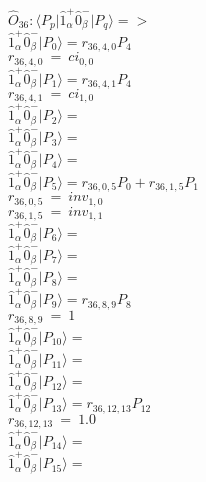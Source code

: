 \documentclass[14pt]{article}
\begin{document}
    $\hat{O}_{36}:  \langle{P_p}\vert \hat{1}_{\alpha}^{+}\hat{0}_{\beta}^{-} \vert{P_q}\rangle => $ \\ 
    $ \hat{1}_{\alpha}^{+}\hat{0}_{\beta}^{-} \vert{P_{0}}\rangle = {r}_{36,4,0}P_{4} $ \\ 
    ${r}_{36,4,0}\ =\ {ci}_{0,0} $ \\ 
    $ \hat{1}_{\alpha}^{+}\hat{0}_{\beta}^{-} \vert{P_{1}}\rangle = {r}_{36,4,1}P_{4} $ \\ 
    ${r}_{36,4,1}\ =\ {ci}_{1,0} $ \\ 
    $ \hat{1}_{\alpha}^{+}\hat{0}_{\beta}^{-} \vert{P_{2}}\rangle =  $ \\ 
    $ \hat{1}_{\alpha}^{+}\hat{0}_{\beta}^{-} \vert{P_{3}}\rangle =  $ \\ 
    $ \hat{1}_{\alpha}^{+}\hat{0}_{\beta}^{-} \vert{P_{4}}\rangle =  $ \\ 
    $ \hat{1}_{\alpha}^{+}\hat{0}_{\beta}^{-} \vert{P_{5}}\rangle = {r}_{36,0,5}P_{0}+{r}_{36,1,5}P_{1} $ \\ 
    ${r}_{36,0,5}\ =\ {inv}_{1,0} $ \\ 
    ${r}_{36,1,5}\ =\ {inv}_{1,1} $ \\ 
    $ \hat{1}_{\alpha}^{+}\hat{0}_{\beta}^{-} \vert{P_{6}}\rangle =  $ \\ 
    $ \hat{1}_{\alpha}^{+}\hat{0}_{\beta}^{-} \vert{P_{7}}\rangle =  $ \\ 
    $ \hat{1}_{\alpha}^{+}\hat{0}_{\beta}^{-} \vert{P_{8}}\rangle =  $ \\ 
    $ \hat{1}_{\alpha}^{+}\hat{0}_{\beta}^{-} \vert{P_{9}}\rangle = {r}_{36,8,9}P_{8} $ \\ 
    ${r}_{36,8,9}\ =\ 1 $ \\ 
    $ \hat{1}_{\alpha}^{+}\hat{0}_{\beta}^{-} \vert{P_{10}}\rangle =  $ \\ 
    $ \hat{1}_{\alpha}^{+}\hat{0}_{\beta}^{-} \vert{P_{11}}\rangle =  $ \\ 
    $ \hat{1}_{\alpha}^{+}\hat{0}_{\beta}^{-} \vert{P_{12}}\rangle =  $ \\ 
    $ \hat{1}_{\alpha}^{+}\hat{0}_{\beta}^{-} \vert{P_{13}}\rangle = {r}_{36,12,13}P_{12} $ \\ 
    ${r}_{36,12,13}\ =\ 1.0 $ \\ 
    $ \hat{1}_{\alpha}^{+}\hat{0}_{\beta}^{-} \vert{P_{14}}\rangle =  $ \\ 
    $ \hat{1}_{\alpha}^{+}\hat{0}_{\beta}^{-} \vert{P_{15}}\rangle =  $ \\ 
    
\end{document}
